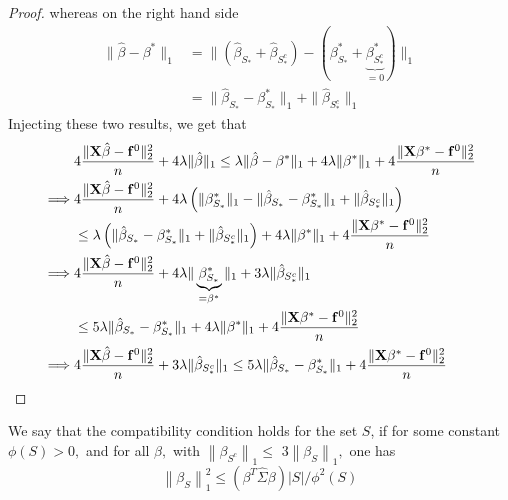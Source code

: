 \begin{proof}
    whereas on the right hand side
    \begin{align*}
        \|\hat{\beta}-\beta^{*} \|_{1}
         & =  \| (\hat{\beta}_{S_{*}} + \hat{\beta}_{S_{*}^{c}}) - (\beta_{S_{*}}^{*} + \underbrace{\beta_{S_{*}^{c}}^*}_{=0}) \|_{1} \\
         & =  \| \hat{\beta}_{S_{*}}-\beta_{S_{*}}^{*} \|_{1} + \|\hat{\beta}_{S_{*}^{c}} \|_{1}
    \end{align*}
    Injecting these two results, we get that
    \begin{align*}
                 & 4 \frac{\| \mathbf{X} \hat \beta - \mathbf{f}^0 \|_{2}^{2}}{n} + 4 \lambda\| \hat \beta \|_{1} \leq \lambda \| \hat\beta - \beta^* \|_{1} + 4 \lambda \| \beta^*\|_{1} + 4\frac{\|\mathbf{X} \beta^* - \mathbf{f}^0\|_{2}^{2}}{n} \\
        \implies &
        4 \frac{\| \mathbf{X} \hat \beta - \mathbf{f}^0 \|_{2}^{2}}{n} + 4 \lambda \left( \|\beta_{S_{*}}^{*} \|_{1} - \|\hat{\beta}_{S_{*}}-\beta_{S_{*}}^{*} \|_{1}+ \|\hat{\beta}_{S_{*}^{c}} \|_{1} \right)                              \\
                 & \leq \lambda \left( \| \hat{\beta}_{S_{*}}-\beta_{S_{*}}^{*} \|_{1} + \|\hat{\beta}_{S_{*}^{c}} \|_{1} \right) + 4 \lambda \| \beta^*\|_{1} + 4\frac{\|\mathbf{X} \beta^* - \mathbf{f}^0\|_{2}^{2}}{n}                    \\
        \implies &
        4 \frac{\| \mathbf{X} \hat \beta - \mathbf{f}^0 \|_{2}^{2}}{n} + 4 \lambda \| \underbrace{\beta_{S_{*}}^{*}}_{= \beta^{*}} \|_{1} + 3 \lambda\|\hat{\beta}_{S_{*}^{c}} \|_{1}                                                        \\
                 & \leq 5 \lambda \| \hat{\beta}_{S_{*}}-\beta_{S_{*}}^{*} \|_{1} + 4 \lambda \| \beta^*\|_{1} + 4\frac{\|\mathbf{X} \beta^* - \mathbf{f}^0\|_{2}^{2}}{n}                                                                    \\
        \implies &
        4 \frac{\| \mathbf{X} \hat \beta - \mathbf{f}^0 \|_{2}^{2}}{n} + 3 \lambda\|\hat{\beta}_{S_{*}^{c}} \|_{1} \leq 5 \lambda \| \hat{\beta}_{S_{*}}-\beta_{S_{*}}^{*} \|_{1} + 4\frac{\|\mathbf{X} \beta^* - \mathbf{f}^0\|_{2}^{2}}{n}         \\
    \end{align*}
\end{proof}

\begin{definition}
    We say that the compatibility condition holds for the set $S$, if for some constant $\phi(S)>0,$ and for all $\beta,$ with $\left\|\beta_{S^{c}}\right\|_{1} \leq$ $3\left\|\beta_{S}\right\|_{1},$ one has
    $$
        \left\|\beta_{S}\right\|_{1}^{2} \leq\left(\beta^{T} \hat{\Sigma} \beta\right)|S| / \phi^{2}(S)
    $$
\end{definition}


